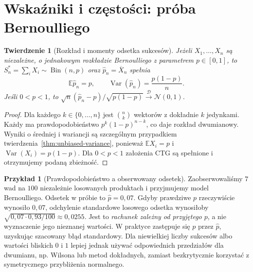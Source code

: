 \documentclass[11pt,a4paper,oneside]{report}
\numberwithin{equation}{chapter}
\theoremstyle{plain}
\newtheorem{twierdzenie}{Twierdzenie}[chapter]
\theoremstyle{definition}
\newtheorem{przyklad}{Przykład}[chapter]
\theoremstyle{remark}
\newcommand{\E}{\mathbb E}
\newcommand{\Var}{\operatorname{Var}}
\newcommand{\Normal}{\mathcal N}
\DeclareMathOperator{\Bin}{Bin}
\begin{document}
\section{Wskaźniki i częstości: próba Bernoulliego}
\begin{twierdzenie}[Rozkład i momenty odsetka sukcesów]\label{thm:prop-bin}
Jeżeli $X_1,\ldots,X_n$ są niezależne, o jednakowym rozkładzie Bernoulliego z parametrem $p\in[0,1]$, to $S_n^*=\sum_iX_i\sim\Bin(n,p)$ oraz $\widehat p_n=\overline X_n$ spełnia
\[
\E\widehat p_n=p,\qquad \Var(\widehat p_n)=\frac{p(1-p)}n.
\]
Jeśli $0<p<1$, to $\sqrt n(\widehat p_n-p)/\sqrt{p(1-p)}\xrightarrow{\mathcal D}\Normal(0,1)$.
\end{twierdzenie}
\begin{proof}
Dla każdego $k\in\{0,\ldots,n\}$ jest $\binom nk$ wektorów z dokładnie $k$ jedynkami. Każdy ma prawdopodobieństwo $p^k(1-p)^{n-k}$, co daje rozkład dwumianowy. Wyniki o średniej i wariancji są szczególnym przypadkiem twierdzenia~\ref{thm:unbiased-variance}, ponieważ $\E X_i=p$ i $\Var(X_i)=p(1-p)$. Dla $0<p<1$ założenia CTG są spełnione i otrzymujemy podaną zbieżność.
\end{proof}

\begin{przyklad}[Prawdopodobieństwo a obserwowany odsetek]\label{ex:failure-rate}
Zaobserwowaliśmy $7$ wad na $100$ niezależnie losowanych produktach i przyjmujemy model Bernoulliego. Odsetek w próbie to $\widehat p=0{,}07$. Gdyby prawdziwe $p$ rzeczywiście wynosiło $0{,}07$, odchylenie standardowe losowego odsetka wynosiłoby $\sqrt{0{,}07\cdot0{,}93/100}\approx0{,}0255$. Jest to \emph{rachunek zależny od przyjętego $p$}, a nie wyznaczenie jego nieznanej wartości. W praktyce zastępuje się $p$ przez $\widehat p$, uzyskując szacowany błąd standardowy. Dla niewielkiej liczby sukcesów albo wartości bliskich $0$ i $1$ lepiej jednak używać odpowiednich przedziałów dla dwumianu, np. Wilsona lub metod dokładnych, zamiast bezkrytycznie korzystać z symetrycznego przybliżenia normalnego.
\end{przyklad}
\end{document}
